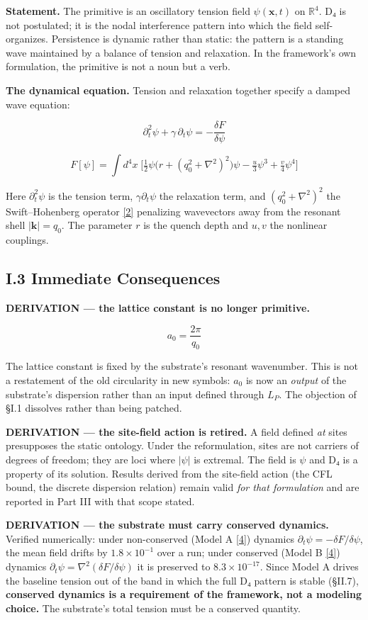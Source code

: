 \documentclass[a4paper,11pt]{article}
\begin{document}
\textbf{Statement.} The primitive is an oscillatory tension field $\psi(\mathbf{x},t)$ on $\mathbb{R}^4$. D₄ is not postulated; it is the nodal interference pattern into which the field self-organizes. Persistence is dynamic rather than static: the pattern is a standing wave maintained by a balance of tension and relaxation. In the framework's own formulation, the primitive is not a noun but a verb.

\textbf{The dynamical equation.} Tension and relaxation together specify a damped wave equation:

\[\partial_t^2\psi+\gamma\,\partial_t\psi=-\frac{\delta F}{\delta\psi}\]

\[F[\psi]=\int d^4x\;\Big[\tfrac12\psi\big(r+(q_0^2+\nabla^2)^2\big)\psi-\tfrac{u}{3}\psi^3+\tfrac{v}{4}\psi^4\Big]\]

Here $\partial_t^2\psi$ is the tension term, $\gamma\partial_t\psi$ the relaxation term, and $(q_0^2+\nabla^2)^2$ the Swift–Hohenberg operator \hyperref[ref2]{[2]} penalizing wavevectors away from the resonant shell $|\mathbf{k}|=q_0$. The parameter $r$ is the quench depth and $u,v$ the nonlinear couplings.

\subsection*{I.3 Immediate Consequences}

\textbf{DERIVATION — the lattice constant is no longer primitive.}

\[a_0=\frac{2\pi}{q_0}\]

The lattice constant is fixed by the substrate's resonant wavenumber. This is not a restatement of the old circularity in new symbols: $a_0$ is now an \textit{output} of the substrate's dispersion rather than an input defined through $L_P$. The objection of §I.1 dissolves rather than being patched.

\textbf{DERIVATION — the site-field action is retired.} A field defined \textit{at} sites presupposes the static ontology. Under the reformulation, sites are not carriers of degrees of freedom; they are loci where $|\psi|$ is extremal. The field is $\psi$ and D₄ is a property of its solution. Results derived from the site-field action (the CFL bound, the discrete dispersion relation) remain valid \textit{for that formulation} and are reported in Part III with that scope stated.

\textbf{DERIVATION — the substrate must carry conserved dynamics.} Verified numerically: under non-conserved (Model A \hyperref[ref4]{[4]}) dynamics $\partial_t\psi=-\delta F/\delta\psi$, the mean field drifts by $1.8\times10^{-1}$ over a run; under conserved (Model B \hyperref[ref4]{[4]}) dynamics $\partial_t\psi=\nabla^2(\delta F/\delta\psi)$ it is preserved to $8.3\times10^{-17}$. Since Model A drives the baseline tension out of the band in which the full D₄ pattern is stable (§II.7), \textbf{conserved dynamics is a requirement of the framework, not a modeling choice.} The substrate's total tension must be a conserved quantity.
\end{document}
